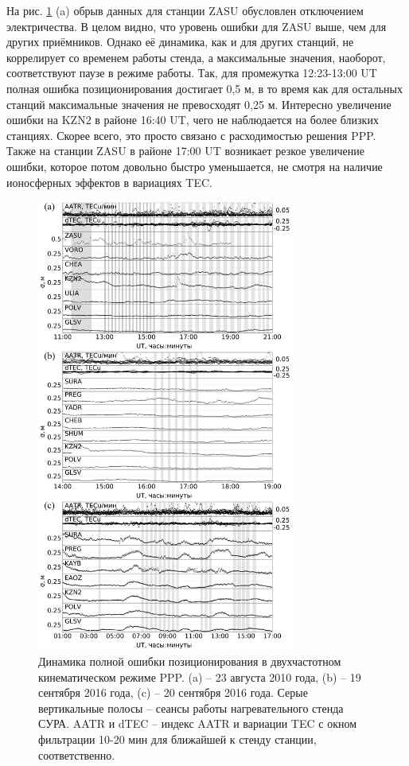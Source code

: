 На рис. \ref{fig-ppp-sura} (a) обрыв данных для станции ZASU обусловлен отключением электричества.
В целом видно, что уровень ошибки для ZASU выше, чем для других приёмников.
Однако её динамика, как и для других станций, не коррелирует со временем работы стенда, а максимальные значения, наоборот, соответствуют паузе в режиме работы.
Так, для промежутка 12:23-13:00 UT полная ошибка позиционирования достигает 0,5 м, в то время как для остальных станций максимальные значения не превосходят 0,25 м.
Интересно увеличение ошибки на KZN2 в районе 16:40 UT, чего не наблюдается на более близких станциях.
Скорее всего, это просто связано с расходимостью решения PPP.
Также на станции ZASU в районе 17:00 UT возникает резкое увеличение ошибки, которое потом довольно быстро уменьшается, не смотря на наличие ионосферных эффектов в вариациях TEC.
\begin{figure}[h]
\centering    
\includegraphics[width=0.75\textwidth]{fig/ppp-sura.png}    
\caption{Динамика полной ошибки позиционирования в двухчастотном кинематическом режиме PPP. (a) -- 23 августа 2010 года, (b) -- 19 сентября 2016 года, (c) -- 20 сентября 2016 года. Серые вертикальные полосы -- сеансы работы нагревательного стенда СУРА. AATR и dTEC -- индекс AATR и вариации TEC с окном фильтрации 10-20 мин для ближайшей к стенду станции, соответственно.}
\label{fig-ppp-sura}      
\end{figure} 
\clearpage

